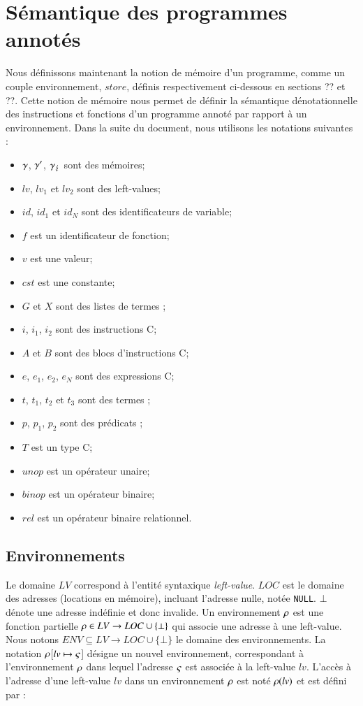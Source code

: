 \section{Sémantique des programmes annotés}
\label{sec:lang-semantics}


Nous définissons maintenant la notion de mémoire d'un programme, comme un couple
environnement, $store$, définis respectivement ci-dessous en sections
?? et ??.
Cette notion de mémoire nous permet de définir la sémantique dénotationnelle des
instructions et fonctions d'un programme annoté par rapport à un environnement.
Dans la suite du document, nous utilisons les notations suivantes :
\begin{itemize}
\item $\gamma$, $\gamma'$, $\gamma_\lightning$ sont des mémoires;
\item $\mathit{lv}$, $\mathit{lv_1}$ et $\mathit{lv_2}$ sont des left-values;
\item $\mathit{id}$, $\mathit{id_1}$ et $\mathit{id_N}$ sont des identificateurs
  de variable;
\item $f$ est un identificateur de fonction;
\item $v$ est une valeur;
\item $\mathit{cst}$ est une constante;
\item $G$ et $X$ sont des listes de termes \eacsl;
\item $i$, $i_1$, $i_2$ sont des instructions C;
\item $A$ et $B$ sont des blocs d'instructions C;
\item $e$, $e_1$, $e_2$, $e_N$ sont des expressions C;
\item $t$, $t_1$, $t_2$ et $t_3$ sont des termes \eacsl;
\item $p$, $p_1$, $p_2$ sont des prédicats \eacsl;
\item $T$ est un type C;
\item $\mathit{unop}$ est un opérateur unaire;
\item $\mathit{binop}$ est un opérateur binaire;
\item $\mathit{rel}$ est un opérateur binaire relationnel.
\end{itemize}


\subsection{Environnements}


Le domaine $LV$ correspond à l'entité syntaxique \textit{left-value}.
$LOC$ est le domaine des adresses (locations en mémoire), incluant l'adresse
nulle, notée \lstinline'NULL'.
$\bot$ dénote une adresse indéfinie et donc invalide.
Un environnement $\rho$ est une fonction partielle
$\rho \in LV \rightarrow LOC \cup \{\bot\}$
qui associe une adresse à une left-value.
Nous notons $ENV \subseteq LV \rightarrow LOC \cup \{\bot\}$ le domaine des
environnements.
La notation $\rho$[$\mathit{lv} \mapsto \varsigma$] désigne un nouvel environnement,
correspondant à l'environnement $\rho$ dans lequel l'adresse $\varsigma$ est associée
à la left-value $\mathit{lv}$.
L'accès à l'adresse d'une left-value $\mathit{lv}$ dans un environnement $\rho$
est noté $\rho(\mathit{lv})$ et est défini par :


